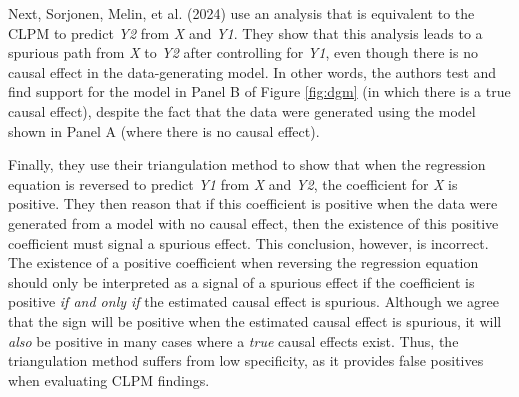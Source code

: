 \documentclass[
  man,mask,floatsintext]{apa6}
\begin{document}
Next, Sorjonen, Melin, et al. (2024) use an analysis that is equivalent to the CLPM to predict \emph{Y2} from \emph{X} and \emph{Y1}. They show that this analysis leads to a spurious path from \emph{X} to \emph{Y2} after controlling for \emph{Y1}, even though there is no causal effect in the data-generating model. In other words, the authors test and find support for the model in Panel B of Figure \ref{fig:dgm} (in which there is a true causal effect), despite the fact that the data were generated using the model shown in Panel A (where there is no causal effect).

Finally, they use their triangulation method to show that when the regression equation is reversed to predict \emph{Y1} from \emph{X} and \emph{Y2}, the coefficient for \emph{X} is positive. They then reason that if this coefficient is positive when the data were generated from a model with no causal effect, then the existence of this positive coefficient must signal a spurious effect. This conclusion, however, is incorrect. The existence of a positive coefficient when reversing the regression equation should only be interpreted as a signal of a spurious effect if the coefficient is positive \emph{if and only if} the estimated causal effect is spurious. Although we agree that the sign will be positive when the estimated causal effect is spurious, it will \emph{also} be positive in many cases where a \emph{true} causal effects exist. Thus, the triangulation method suffers from low specificity, as it provides false positives when evaluating CLPM findings.
\end{document}
